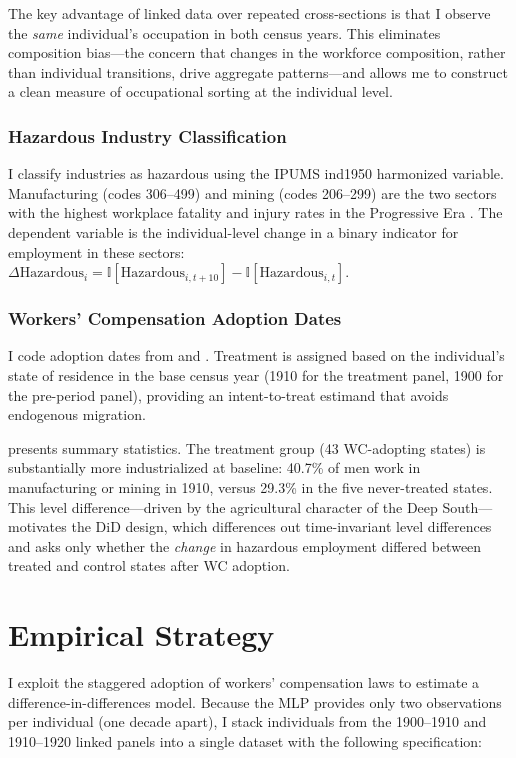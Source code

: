 \documentclass[12pt]{article}
\newcommand{\ind}{\mathbb{I}}
\begin{document}
The key advantage of linked data over repeated cross-sections is that I observe the \textit{same} individual's occupation in both census years. This eliminates composition bias---the concern that changes in the workforce composition, rather than individual transitions, drive aggregate patterns---and allows me to construct a clean measure of occupational sorting at the individual level.

\subsubsection*{Hazardous Industry Classification} I classify industries as hazardous using the IPUMS ind1950 harmonized variable. Manufacturing (codes 306--499) and mining (codes 206--299) are the two sectors with the highest workplace fatality and injury rates in the Progressive Era \citep{aldrich1997}. The dependent variable is the individual-level change in a binary indicator for employment in these sectors: $\Delta \text{Hazardous}_i = \ind[\text{Hazardous}_{i,t+10}] - \ind[\text{Hazardous}_{i,t}]$.

\subsubsection*{Workers' Compensation Adoption Dates} I code adoption dates from \citet{fishback2000} and \citet{berkowitz1985}. Treatment is assigned based on the individual's state of residence in the base census year (1910 for the treatment panel, 1900 for the pre-period panel), providing an intent-to-treat estimand that avoids endogenous migration.

 presents summary statistics. The treatment group (43 WC-adopting states) is substantially more industrialized at baseline: 40.7\% of men work in manufacturing or mining in 1910, versus 29.3\% in the five never-treated states. This level difference---driven by the agricultural character of the Deep South---motivates the DiD design, which differences out time-invariant level differences and asks only whether the \textit{change} in hazardous employment differed between treated and control states after WC adoption.




\section{Empirical Strategy}\label{sec:strategy}

I exploit the staggered adoption of workers' compensation laws to estimate a difference-in-differences model. Because the MLP provides only two observations per individual (one decade apart), I stack individuals from the 1900--1910 and 1910--1920 linked panels into a single dataset with the following specification:
\end{document}
